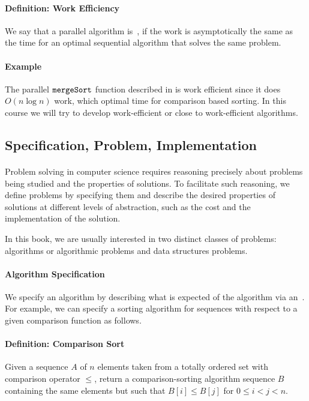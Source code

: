 \paragraph{Definition: Work Efficiency}
We say that a parallel algorithm is~, if the work is asymptotically the same as the time for
an optimal sequential algorithm that solves the same problem.

\paragraph{Example}
The parallel $\texttt{mergeSort}$ function described in
 is work efficient since it does $O(n \log n)$
work, which optimal time for comparison based sorting.  In this course
we will try to develop work-efficient or close to work-efficient
algorithms.



\subsection{Specification, Problem, Implementation}

\paragraph{}
Problem solving in computer science requires reasoning precisely about
problems being studied and the properties of solutions.
%
To facilitate such reasoning,  we define problems by
specifying them and describe the desired properties of solutions at
different levels of abstraction, such as the cost and the
implementation  of the solution.

In this book, we are usually interested in two distinct classes of
problems: algorithms or algorithmic problems and data structures
problems.

\paragraph{Algorithm Specification}
We specify an algorithm by describing what is expected of the
algorithm via an~.
%
For example, we can specify a sorting algorithm for sequences with
respect to a given comparison function as follows.

\paragraph{Definition: Comparison Sort}
Given a sequence $A$ of $n$ elements taken from a totally ordered set
with comparison operator $\leq$, return a comparison-sorting algorithm
sequence $B$ containing the same elements but such that $B[i] \leq
B[j]$ for $0 \leq i < j < n$.

